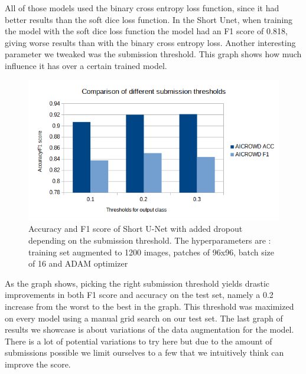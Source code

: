 \documentclass[10pt,conference,compsocconf]{IEEEtran}
\begin{document}
\newline
All of those models used the binary cross entropy loss function, since it had better results than the soft dice loss function. In the Short Unet, when training the model with the soft dice loss function the model had an F1 score of 0.818, giving worse results than with the binary cross entropy loss.
\newline
Another interesting parameter we tweaked was the submission threshold. This graph shows how much influence it has over a certain trained model.
\vspace{-0.2in}
\begin{figure}[H]
    \centering
    \includegraphics[scale = 0.3]{report_images/thresholds_graph.png} %
    \vspace{-0.1in}
    \caption{Accuracy and F1 score of Short U-Net with added dropout depending on the submission threshold. The hyperparameters are : training set augmented to 1200 images, patches of 96x96, batch size of 16 and ADAM optimizer}
\end{figure}
\vspace{-0.1in}
As the graph shows, picking the right submission threshold yields drastic improvements in both F1 score and accuracy on the test set, namely a 0.2 increase from the worst to the best in the graph. This threshold was maximized on every model using a manual grid search on our test set.
\newline
\label{results_data}
The last graph of results we showcase is about variations of the data augmentation for the model. There is a lot of potential variations to try here but due to the amount of submissions possible we limit ourselves to a few that we intuitively think can improve the score.
\vspace{-0.2in}
\end{document}
